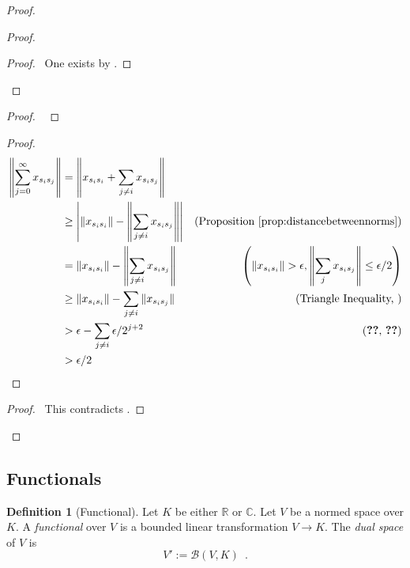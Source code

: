 \documentclass{book}
\let\qed\relax
\theoremstyle{definition}
\newtheorem{df}[ax]{Definition}
\begin{document}
\begin{proof}
\begin{proof}
	\begin{proof}
		\pf\ One exists by .
	\end{proof}
\end{proof}
\begin{proof}
	\pf\ 
\end{proof}
\begin{proof}
	\pf
	\begin{align*}
		\left\| \sum_{j=0}^\infty x_{s_is_j} \right\|
		& = \left\| x_{s_is_i} + \sum_{j \neq i} x_{s_is_j} \right\| \\
		& \geq \left| \| x_{s_is_i} \| - \left\| \sum_{j \neq i} x_{s_is_j} \right\| \right| & (\text{Proposition \ref{prop:distancebetweennorms}}) \\
		& = \| x_{s_is_i} \| - \left\| \sum_{j \neq i} x_{s_is_j} \right\| & \left( \| x_{s_is_i} \| > \epsilon, \left\| \sum_j x_{s_is_j} \right\| \leq \epsilon /2\right) \\
		& \geq  \| x_{s_is_i} \| - \sum_{j \neq i} \| x_{s_is_j} \| & (\text{Triangle Inequality, }) \\
		& > \epsilon - \sum_{j \neq i} \epsilon / 2^{j+2} & (\text{\stepref{6}, \stepref{10}}) \\
		& > \epsilon / 2
	\end{align*}
\end{proof}
\qedstep
\begin{proof}
	\pf\ This contradicts .
\end{proof}
\qed
\end{proof}

\subsection{Functionals}

\begin{df}[Functional]
Let $K$ be either $\mathbb{R}$ or $\mathbb{C}$. Let $V$ be a normed space over $K$. A \emph{functional} over $V$ is a bounded linear transformation $V \rightarrow K$. The \emph{dual space} of $V$ is
\[ V' := \mathcal{B}(V,K) \enspace . \]
\end{df}
\end{document}
